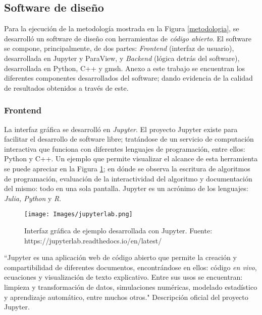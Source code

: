 \subsection{Software de dise\~no}

\noindent
\justify

Para la ejecuci\'on de la metodolog\'ia mostrada en la Figura \ref{metodologia}, se desarroll\'o un software de dise\~no con herramientas de \textit{c\'odigo abierto}. El software se compone, principalmente, de dos partes: \textit{Frontend} (interfaz de usuario), desarrollada en Jupyter y ParaView, y \textit{Backend} (l\'ogica detr\'as del software), desarrollada en Python, C++ y gmsh. Anexo a este trabajo se encuentran los diferentes componentes desarrollados del software; dando evidencia de la calidad de resultados obtenidos a trav\'es de este.

\subsubsection{Frontend}

\noindent
\justify

La interfaz gr\'afica se desarroll\'o en \textit{Jupyter}. El proyecto Jupyter existe para facilitar el desarrollo de software libre; trat\'andose de un servicio de computaci\'on interactiva que funciona con diferentes lenguajes de programaci\'on, entre ellos: Python y C++. Un ejemplo que permite visualizar el alcance de esta herramienta se puede apreciar en la Figura \ref{jupyter}; en d\'onde se observa la escritura de algoritmos de programaci\'on, evaluaci\'on de la interactividad del algoritmo y documentaci\'on del mismo: todo en una sola pantalla. Jupyter es un acr\'onimo de los lenguajes: \textit{Julia, Python} y \textit{R}.

\begin{figure}[h!]
	\centering
	\texttt{[image: Images/jupyterlab.png]}
	\caption{Interfaz gr\'afica de ejemplo desarrollada con Jupyter. Fuente: https://jupyterlab.readthedocs.io/en/latest/}
	\label{jupyter}
\end{figure}

\noindent
\justify

``Jupyter es una aplicaci\'on web de c\'odigo abierto que permite la creaci\'on y compartibilidad de diferentes documentos, encontr\'andose en ellos: c\'odigo \textit{en vivo}, ecuaciones y visualizaci\'on de texto explicativo. Entre sus usos se encuentran: limpieza y transformaci\'on de datos, simulaciones num\'ericas, modelado estad\'istico y aprendizaje autom\'atico, entre muchos otros." Descripci\'on oficial del proyecto Jupyter.

